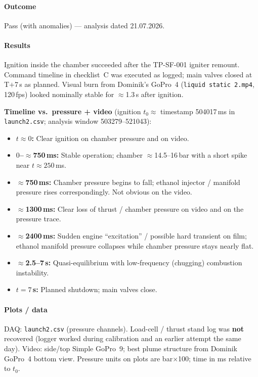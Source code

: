 \paragraph{Outcome}
Pass (with anomalies) --- analysis dated 21.07.2026.

\paragraph{Results}
Ignition inside the chamber succeeded after the TP-SF-001 igniter remount.
Command timeline in checklist~C was executed as logged; main valves closed at
T$+$7\,s as planned. Visual burn from Dominik's GoPro~4 (\texttt{liquid static 2.mp4},
120\,fps) looked nominally stable for $\approx$1.3\,s after ignition.

\medskip
\noindent\textbf{Timeline vs.\ pressure + video} (ignition $t_0 \approx$ timestamp 504017\,ms
in \texttt{launch2.csv}; analysis window 503279--521043):
\begin{itemize}
  \item \textbf{$t \approx 0$:} Clear ignition on chamber pressure and on video.
  \item \textbf{$0$--$\approx$750\,ms:} Stable operation; chamber $\approx$14.5--16\,bar with a
    short spike near $t \approx 250$\,ms.
  \item \textbf{$\approx$750\,ms:} Chamber pressure begins to fall; ethanol injector /
    manifold pressure rises correspondingly. Not obvious on the video.
  \item \textbf{$\approx$1300\,ms:} Clear loss of thrust / chamber pressure on video and
    on the pressure trace.
  \item \textbf{$\approx$2400\,ms:} Sudden engine ``excitation'' / possible hard transient
    on film; ethanol manifold pressure collapses while chamber pressure stays nearly
    flat.
  \item \textbf{$\approx$2.5--7\,s:} Quasi-equilibrium with low-frequency (chugging) combustion
    instability.
  \item \textbf{$t = 7$\,s:} Planned shutdown; main valves close.
\end{itemize}

\paragraph{Plots / data}
DAQ: \texttt{launch2.csv} (pressure channels). Load-cell / thrust stand log was
\textbf{not} recovered (logger worked during calibration and an earlier
attempt the same day). Video: side/top Simple GoPro~9; best plume structure from
Dominik GoPro~4 bottom view. Pressure units on plots are bar$\times$100; time in ms
relative to $t_0$.

